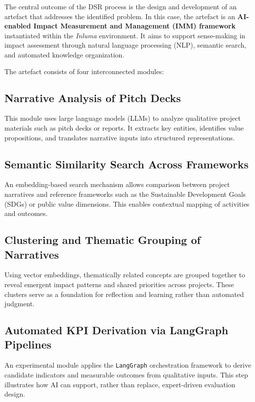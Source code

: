 The central outcome of the DSR process is the design and development of an artefact that addresses the identified problem.
In this case, the artefact is an \textbf{AI-enabled Impact Measurement and Management (IMM) framework} instantiated within the \textit{Inluma} environment.
It aims to support sense-making in impact assessment through natural language processing (NLP), semantic search, and automated knowledge organization.

The artefact consists of four interconnected modules:

\subsection{Narrative Analysis of Pitch Decks}
This module uses large language models (LLMs) to analyze qualitative project materials such as pitch decks or reports.
It extracts key entities, identifies value propositions, and translates narrative inputs into structured representations.

\subsection{Semantic Similarity Search Across Frameworks}
An embedding-based search mechanism allows comparison between project narratives and reference frameworks such as the Sustainable Development Goals (SDGs) or public value dimensions.
This enables contextual mapping of activities and outcomes.

\subsection{Clustering and Thematic Grouping of Narratives}
Using vector embeddings, thematically related concepts are grouped together to reveal emergent impact patterns and shared priorities across projects.
These clusters serve as a foundation for reflection and learning rather than automated judgment.

\subsection{Automated KPI Derivation via LangGraph Pipelines}
An experimental module applies the \texttt{LangGraph} orchestration framework to derive candidate indicators and measurable outcomes from qualitative inputs.
This step illustrates how AI can support, rather than replace, expert-driven evaluation design.


